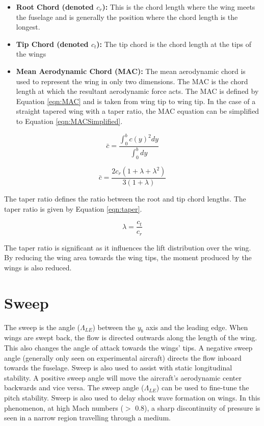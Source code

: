 \begin{itemize}
    \item \textbf{Root Chord (denoted $c_r$):} This is the chord length where the wing meets the fuselage and is generally the position where the chord length is the longest. 
    \item \textbf{Tip Chord (denoted $c_t$):} The tip chord is the chord length at the tips of the wings 
    \item \textbf{Mean Aerodynamic Chord (MAC):} The mean aerodynamic chord is used to represent the wing in only two dimensions. The MAC is the chord length at which the resultant aerodynamic force acts. The MAC is defined by Equation \ref{eqn:MAC} and is taken from wing tip to wing tip. In the case of a straight tapered wing with a taper ratio, the MAC equation can be simplified to Equation \ref{eqn:MACSimplified}.
    
\end{itemize} 

\begin{equation}
    \bar{c} =  \frac{ \int_{0}^{b} c(y)^2 dy}{\int_{0}^{b} dy}
    \label{eqn:MAC}
\end{equation}

\begin{equation}
    \bar{c} =  \frac{ 2c_r(1 + \lambda + \lambda^2)}{3(1 + \lambda)}
    \label{eqn:MACSimplified}
\end{equation}

 The taper ratio defines the ratio between the root and tip chord lengths. The taper ratio is given by Equation \ref{eqn:taper}.
 
 \begin{equation}
     \lambda = \frac{c_t}{c_r}
     \label{eqn:taper}
 \end{equation}
 
 The taper ratio is significant as it influences the lift distribution over the wing. By reducing the wing area towards the wing tips, the moment produced by the wings is also reduced. 
 
\section{Sweep}
The sweep is the angle ($\Lambda_{LE}$) between the $y_b$ axis and the leading edge. When wings are swept back, the flow is directed outwards along the length of the wing. This also changes the angle of attack towards the wings' tips. A negative sweep angle (generally only seen on experimental aircraft) directs the flow inboard towards the fuselage. Sweep is also used to assist with static longitudinal stability. A positive sweep angle will move the aircraft's aerodynamic center backwards and vice versa. The sweep angle ($\Lambda_{LE}$) can be used to fine-tune the pitch stability. Sweep is also used to delay shock wave formation on wings. In this phenomenon, at high Mach numbers ($>$ 0.8), a sharp discontinuity of pressure is seen in a narrow region travelling through a medium. 



